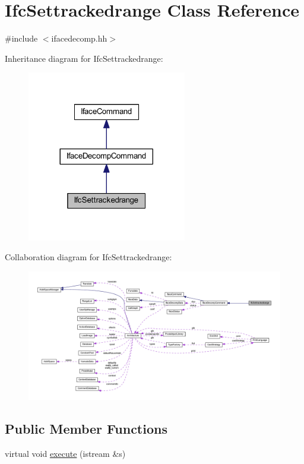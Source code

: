 \hypertarget{class_ifc_settrackedrange}{}\section{Ifc\+Settrackedrange Class Reference}
\label{class_ifc_settrackedrange}


{\ttfamily \#include $<$ifacedecomp.\+hh$>$}



Inheritance diagram for Ifc\+Settrackedrange\+:
\nopagebreak
\begin{figure}[H]
\begin{center}
\leavevmode
\includegraphics[width=197pt]{class_ifc_settrackedrange__inherit__graph}
\end{center}
\end{figure}


Collaboration diagram for Ifc\+Settrackedrange\+:
\nopagebreak
\begin{figure}[H]
\begin{center}
\leavevmode
\includegraphics[width=350pt]{class_ifc_settrackedrange__coll__graph}
\end{center}
\end{figure}
\subsection*{Public Member Functions}
\begin{DoxyCompactItemize}
\item 
virtual void \mbox{\hyperlink{class_ifc_settrackedrange_acaa8f1641f3ffac2da07d34c377ef299}{execute}} (istream \&s)
\end{DoxyCompactItemize}

